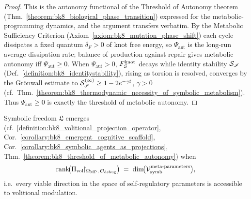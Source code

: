 \begin{proof}
\label{proof:bk8_threshold_of_metabolic_autonomy}
\leavevmode
This is the autonomy functional of the Threshold of Autonomy theorem (Thm.~\ref{theorem:bk8_biological_phase_transition}) expressed for the metabolic-programming dynamics, and the argument transfers verbatim. By the Metabolic Sufficiency Criterion (Axiom~\ref{axiom:bk8_mutation_phase_shift}) each cycle dissipates a fixed quantum $\delta_F>0$ of knot free energy, so $\Psi_{\mathrm{aut}}$ is the long-run average dissipation rate; balance of production against repair gives metabolic autonomy iff $\Psi_{\mathrm{aut}}\ge 0$. When $\Psi_{\mathrm{aut}}>0$, $F_S^{\text{knot}}$ decays while identity stability $\mathcal{S}_{\mathscr{I}}$ (Def.~\ref{definition:bk8_identitystability}), rising as torsion is resolved, converges by the Grönwall estimate to $\mathcal{S}_{\mathscr{I}}^{(\infty)}\ge 1-2e^{-\gamma t}$, $\gamma>0$ (cf.~Thm.~\ref{theorem:bk8_thermodynamic_necessity_of_symbolic_metabolism}). Thus $\Psi_{\mathrm{aut}}\ge 0$ is exactly the threshold of metabolic autonomy.
\end{proof}
\begin{theorem}
\label{theorem:bk8_freedom_via_meta_metabolic_control}
Symbolic freedom $\mathfrak{L}$ emerges (cf.~\ref{definition:bk8_volitional_projection_operator}, Cor.~\ref{corollary:bk8_emergent_cognitive_scaffold}, Cor.~\ref{corollary:bk8_symbolic_agents_as_projections}, Thm.~\ref{theorem:bk8_threshold_of_metabolic_autonomy}) when
\[
\operatorname{rank}\!\bigl(
  \Pi_{\mathrm{vol}}
    \!\!\restriction_{\Omega_{\mathrm{MP}},\,\mathcal{O}_{\mathrm{debug}}}
\bigr)
  \;=\;
  \dim\!\bigl(\mathcal{V}_{\mathrm{symb}}^{\text{meta‑parameters}}\bigr),
\]
i.e.\ every viable direction in the space of self‑regulatory parameters
is accessible to volitional modulation.
\end{theorem}
